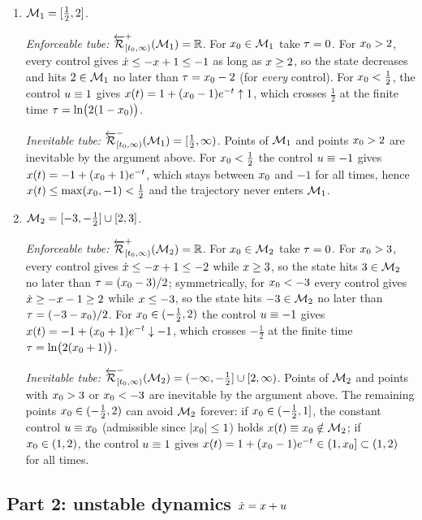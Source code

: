 \begin{enumerate}[label=(\alph*), itemsep=3pt]
\item $\mathcal{M}_1=[\tfrac12,2]$.

\emph{Enforceable tube:} ${\overleftarrow{{\mathcal{R}}}}^+_{[{t}_0,\infty)}(\mathcal{M}_1)=\mathbb{R}$.
For ${x}_0\in\mathcal{M}_1$ take ${\tau}=0$. For ${x}_0>2$, every control gives
$\dot{{x}}\le-{x}+1\le-1$ as long as ${x}\ge2$, so the state decreases and hits $2\in\mathcal{M}_1$ no
later than ${\tau}={x}_0-2$ (for \emph{every} control). For ${x}_0<\tfrac12$, the control
${u}\equiv1$ gives ${x}({t})=1+({x}_0-1)e^{-{t}}\uparrow1$, which crosses $\tfrac12$ at
the finite time ${\tau}=\ln\bigl(2(1-{x}_0)\bigr)$.

\emph{Inevitable tube:} ${\overleftarrow{{\mathcal{R}}}}^-_{[{t}_0,\infty)}(\mathcal{M}_1)=[\tfrac12,\infty)$.
Points of $\mathcal{M}_1$ and points ${x}_0>2$ are inevitable by the argument above. For
${x}_0<\tfrac12$ the control ${u}\equiv-1$ gives ${x}({t})=-1+({x}_0+1)e^{-{t}}$,
which stays between ${x}_0$ and $-1$ for all times, hence ${x}({t})\le\max({x}_0,-1)<\tfrac12$
and the trajectory never enters $\mathcal{M}_1$.

\item $\mathcal{M}_2=[-3,-\tfrac12]\cup[2,3]$.

\emph{Enforceable tube:} ${\overleftarrow{{\mathcal{R}}}}^+_{[{t}_0,\infty)}(\mathcal{M}_2)=\mathbb{R}$.
For ${x}_0\in\mathcal{M}_2$ take ${\tau}=0$. For ${x}_0>3$, every control gives
$\dot{{x}}\le-{x}+1\le-2$ while ${x}\ge3$, so the state hits $3\in\mathcal{M}_2$ no later than
${\tau}=({x}_0-3)/2$; symmetrically, for ${x}_0<-3$ every control gives
$\dot{{x}}\ge-{x}-1\ge2$ while ${x}\le-3$, so the state hits $-3\in\mathcal{M}_2$ no later than
${\tau}=(-3-{x}_0)/2$. For ${x}_0\in(-\tfrac12,2)$ the control ${u}\equiv-1$ gives
${x}({t})=-1+({x}_0+1)e^{-{t}}\downarrow-1$, which crosses $-\tfrac12$ at the finite time
${\tau}=\ln\bigl(2({x}_0+1)\bigr)$.

\emph{Inevitable tube:} ${\overleftarrow{{\mathcal{R}}}}^-_{[{t}_0,\infty)}(\mathcal{M}_2)=(-\infty,-\tfrac12]\cup[2,\infty)$.
Points of $\mathcal{M}_2$ and points with ${x}_0>3$ or ${x}_0<-3$ are inevitable by the argument above.
The remaining points ${x}_0\in(-\tfrac12,2)$ can avoid $\mathcal{M}_2$ forever: if ${x}_0\in(-\tfrac12,1]$,
the constant control ${u}\equiv{x}_0$ (admissible since $|{x}_0|\le1$) holds
${x}({t})\equiv{x}_0\notin\mathcal{M}_2$; if ${x}_0\in(1,2)$, the control ${u}\equiv1$ gives
${x}({t})=1+({x}_0-1)e^{-{t}}\in(1,{x}_0]\subset(1,2)$ for all times.
\end{enumerate}

\subsection*{Part 2: unstable dynamics $\dot{{x}}={x}+{u}$}

